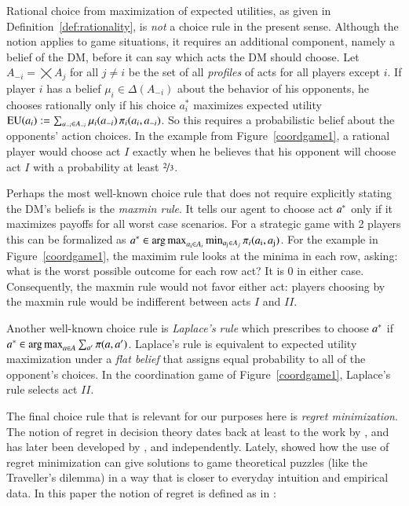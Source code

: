 \documentclass[fleqn,reqno,11pt]{article}
\begin{document}
Rational choice from maximization of expected utilities, as given in
Definition~\ref{def:rationality}, is \emph{not} a choice rule in the present sense. Although
the notion applies to game situations, it requires an additional component, namely a
belief of the DM, before it can say which acts the DM should choose. Let
$A_{-i} = \bigtimes A_j$ for all $j \neq i$ be the set of all \emph{profiles} of acts for all
players except $i$. If player $i$ has a belief $\mu_i \in \Delta(A_{-i})$ about the behavior of
his opponents, he chooses rationally only if his choice $a^*_i$ maximizes expected utility
$\operatorname{EU}(a_i) := \sum_{a_{-i} \in A_{-i}} \mu_i(a_{-i}) \thinspace \pi_i(a_i, a_{-i})$. So this
requires a probabilistic belief about the opponents' action choices. In the example from
Figure~\ref{coordgame1}, a rational player would choose act $I$ exactly when he believes that
his opponent will choose act $I$ with a probability at least $\nicefrac{2}{3}$.

Perhaps the most well-known choice rule that does not require explicitly stating the DM's
beliefs is the \emph{maxmin rule}. It tells our agent to choose act $a^*$ only if it
maximizes payoffs for all worst case scenarios. For a strategic game with 2 players this can be
formalized as
$a^* \in \operatorname*{arg\,max}_{a_{\text{i}} \in A_i} \min_{a_{\text{j}} \in A_j} \pi_i(a_{\text{i}},
a_{\text{j}})$.
For the example in Figure~\ref{coordgame1}, the maximim rule looks at the minima in each row,
asking: what is the worst possible outcome for each row act? It is $0$ in either
case. Consequently, the maxmin rule would not favor either act: players choosing by the
maxmin rule would be indifferent between acts $I$ and $II$.

Another well-known choice rule is \emph{Laplace's rule} which prescribes to choose $a^*$ if
$a^* \in \operatorname*{arg\,max}_{a \in A} \sum_{a'} \pi(a, a')$. Laplace's rule is equivalent to expected utility maximization under a \emph{flat belief} that assigns equal probability to all of the opponent's
choices. In the coordination game of Figure~\ref{coordgame1}, Laplace's rule selects act $II$.

The final choice rule that is relevant for our purposes here is \emph{regret
  minimization}. The notion of regret in decision theory dates back at least to the work by
\citet{Savage1951:The-theory-of-s}, and has later been developed by \citet{bell82}, \citet{fish82} and \citet{loosug82} independently. Lately,
\citet{HalpernPass2012:Iterated-Regret} showed how the use of regret minimization can give
solutions to game theoretical puzzles (like the Traveller's dilemma) in a way that is closer to
everyday intuition and empirical data. In this paper the notion of regret is defined as in
\citet{HalpernPass2012:Iterated-Regret}:
\end{document}

